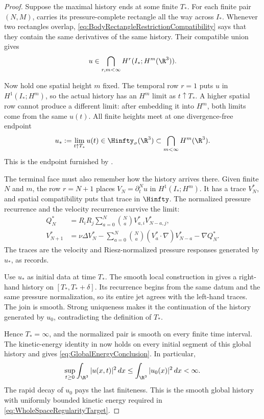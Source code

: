 \begin{proof}
Suppose the maximal history ends at some finite \(T_*\).
For each finite pair \((N,M)\),
 carries its pressure-complete
rectangle all the way across \(I_*\).  Whenever two rectangles overlap,
\eqref{eq:BodyRectangleRestrictionCompatibility} says that they contain the
same derivatives of the same history.  Their compatible union gives
\[
  u\in\bigcap_{r,m<\infty}H^r(I_*;H^m(\R^3)).
\]

Now hold one spatial height \(m\) fixed.  The temporal row \(r=1\) puts
\(u\) in \(H^1(I_*;H^m)\), so the actual history has an \(H^m\) limit as
\(t\uparrow T_*\).  A higher spatial row cannot produce a different limit:
after embedding it into \(H^m\), both limits come from the same \(u(t)\).
All finite heights meet at one divergence-free endpoint
\begin{equation}\label{eq:BodyCommonSmoothEndpoint}
  u_*:=\lim_{t\uparrow T_*}u(t)
  \in\Hinfty_\sigma(\R^3)
  \subset\bigcap_{m<\infty}H^m(\R^3).
\end{equation}
This is the endpoint furnished by .

The terminal face must also remember how the history arrives there.  Given
finite \(N\) and \(m\), the row \(r=N+1\) places
\(V_N=\partial_t^Nu\) in \(H^1(I_*;H^m)\).  It has a trace \(V_N^*\), and
spatial compatibility puts that trace in \(\Hinfty\).  The normalized pressure
recurrence and the velocity recurrence survive the limit:
\begin{align*}
  Q_N^*
  &=R_iR_j\sum_{a=0}^{N}\binom{N}{a}V_{a,i}^*V_{N-a,j}^*,
  \\
  V_{N+1}^*
  &=\nu\Delta V_N^*
  -\sum_{a=0}^{N}\binom{N}{a}(V_a^*\cdot\nabla)V_{N-a}^*
  -\nabla Q_N^*.
\end{align*}
The traces are the velocity and Riesz-normalized pressure responses generated
by \(u_*\), as  records.

Use \(u_*\) as initial data at time \(T_*\).  The smooth local construction in
 gives a right-hand history on
\([T_*,T_*+\delta]\).  Its recurrence begins from the same datum and the same
pressure normalization, so its entire jet agrees with the left-hand traces.
The join is smooth.  Strong uniqueness makes it the continuation of the
history generated by \(u_0\), contradicting the definition of \(T_*\).

Hence \(T_*=\infty\), and the normalized pair is smooth on every finite time
interval.  The kinetic-energy identity in
 now holds on every initial segment
of this global history and gives \eqref{eq:GlobalEnergyConclusion}.  In
particular,
\[
  \sup_{t\geq0}\int_{\R^3}|u(x,t)|^2\,dx
  \leq
  \int_{\R^3}|u_0(x)|^2\,dx
  <\infty.
\]
The rapid decay of \(u_0\) pays the last finiteness.  This is the smooth global
history with uniformly bounded kinetic energy required in
\eqref{eq:WholeSpaceRegularityTarget}.
\end{proof}


